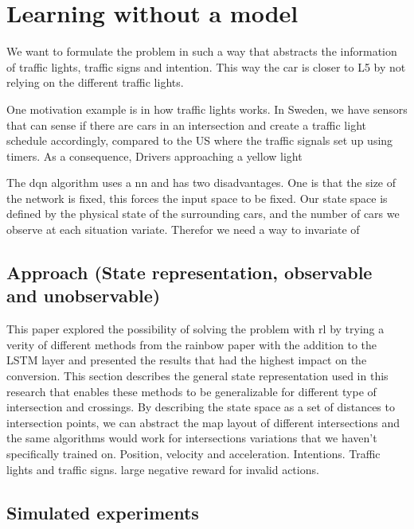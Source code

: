 \chapter{Learning without a model}
We want to formulate the problem in such a way that abstracts the information of traffic lights, traffic signs and intention. This way the car is closer to L5 by not relying on the different traffic lights.

One motivation example is in how traffic lights works. In Sweden, we have sensors that can sense if there are cars in an intersection and create a traffic light schedule accordingly, compared to the US where the traffic signals set up using timers. As a consequence, Drivers approaching a yellow light 

The \gls{dqn} algorithm uses a \gls{nn} and has two disadvantages. One is that the size of the network is fixed, this forces the input space to be fixed. Our state space is defined by the physical state of the surrounding cars, and the number of cars we observe at each situation variate. Therefor we need a way to invariate of 

\section{Approach (State representation, observable and unobservable)}
This paper explored the possibility of solving the problem with \gls{rl} by trying a verity of different methods from the rainbow paper with the addition to the LSTM layer and presented the results that had the highest impact on the conversion. 
This section describes the general state representation used in this research that enables these methods to be generalizable for different type of intersection and crossings. 
By describing the state space as a set of distances to intersection points, we can abstract the map layout of different intersections and the same algorithms would work for intersections variations that we haven't specifically trained on. 
Position, velocity and acceleration. 
Intentions. Traffic lights and traffic signs. 
large negative reward for invalid actions.
\section{Simulated experiments}
